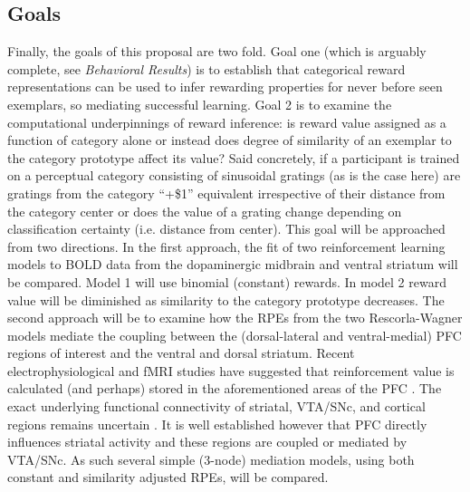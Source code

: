 \documentclass[doc,12pt]{apa}        %
\begin{document}



\subsection{Goals} %
\label{sub:goals}
Finally, the goals of this proposal are two fold.  Goal one (which is arguably complete, see \emph{Behavioral Results}) is to establish that categorical reward representations can be used to infer rewarding properties for never before seen exemplars, so mediating successful learning.  Goal 2 is to examine the computational underpinnings of reward inference: is reward value assigned as a function of category alone or instead does degree of similarity of an exemplar to the category prototype affect its value? Said concretely, if a participant is trained on a perceptual category consisting of sinusoidal gratings (as is the case here) are gratings from the category ``+\$1'' equivalent irrespective of their distance from the category center or does the value of a grating change depending on classification certainty (i.e. distance from center).  This goal will be approached from two directions.  In the first approach, the fit of two reinforcement learning models to BOLD data from the dopaminergic midbrain and ventral striatum will be compared.  Model 1 will use binomial (constant) rewards. In model 2 reward value will be diminished as similarity to the category prototype decreases.  The second approach will be to examine how the RPEs from the two Rescorla-Wagner models mediate the coupling between the (dorsal-lateral and ventral-medial) PFC regions of interest and the ventral and dorsal striatum.  Recent electrophysiological and fMRI studies have suggested that reinforcement value is calculated (and perhaps) stored in the aforementioned areas of the PFC \cite{Daw:2011p7995,Bornstein:2011p7996,Frank:2011p8152,OReilly:2010p7612,OReilly:2006p1161,OReilly:2006p2615}.  The exact underlying functional connectivity of striatal, VTA/SNc, and cortical regions remains uncertain \cite{Daw:2011p7995,Bornstein:2011p7996,Frank:2011p8152}.  It is well established however that PFC directly influences striatal activity and these regions are coupled or mediated by VTA/SNc.   As such several simple (3-node) mediation models, using both constant and similarity adjusted RPEs, will be compared.
\end{document}

